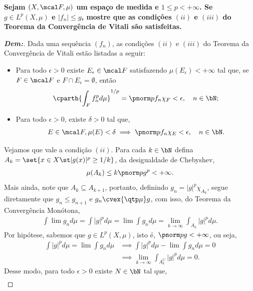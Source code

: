 \textbf{Sejam $(X, \mcal F, \mu)$ um espaço de medida e $1 \le p < + \infty$. 
Se $g \in L^p(X, \mu)$ e $|f_n| \le g$, mostre que as condições 
$(ii)$ e $(iii)$ do Teorema da Convergência de Vitali são satisfeitas.}
\begin{proof}[\textbf{Dem:}]Dada uma sequência $(f_n)$, as condições
  $(ii)$ e $(iii)$ do Teorema 
  da Convergência de Vitali estão listadas a seguir: 
  \begin{itemize}
    \item Para todo $\epsilon > 0$ existe $E_\epsilon \in \mcal F$ satisfazendo 
      $\mu(E_\epsilon)<+\infty$ tal que, se $F \in \mcal F$ e 
      $F \cap E_\epsilon = \emptyset$, então 
      \begin{align*}
        \cparth{\int_F f_n^p d\mu}^{1/p} = \pnorm p {f_n \chi_F} < \epsilon, 
        \quad n \in \bN;
      \end{align*}
    \item Para todo $\epsilon > 0$, existe $\delta >  0$ tal que, 
      \begin{align*}
        E \in \mcal F, \mu(E) < \delta \implies \pnorm p {f_n \chi_{E}} < \epsilon, 
        \quad n \in \bN.
      \end{align*}
  \end{itemize}
  Vejamos que vale a condição $(ii)$. Para cada 
  $k \in \bN$ defina $A_k = \set{x \in X \st |g(x)|^p \ge 1/k}$, 
  da desigualdade de Chebyshev,
  \begin{align*}
    \mu(A_k) \le k \pnorm p g^p < +\infty.
  \end{align*}
  Mais ainda, note que $A_{k} \subseteq A_{k+1}$, portanto, definindo 
  $g_n = |g|^p \chi_{A_k}$,
  segue diretamente que $g_n \le g_{n+1}$ e $g_n \cvex {\qtp \mu} g$, com isso, do Teorema 
  da Convergência Monótona, 
  \begin{align*}
    \int \lim g_n d\mu = \int|g|^p d\mu = \lim \int g_n d\mu 
    = \lim_{k \rightarrow \infty} \int_{A_k} |g|^p d\mu.
  \end{align*}
  Por hipótese, sabemos que $g \in L^p(X, \mu)$, isto é, $\pnorm p g < +\infty$, ou seja,
  \begin{align*}
    \int |g|^p d\mu = \lim \int g_n d\mu &\implies \int |g|^p d\mu - \lim \int g_n d\mu = 0\\
    &\implies \lim_{k \rightarrow \infty} \int_{A_k^C}|g|^p d\mu = 0. 
  \end{align*}
  Desse modo, para todo $\epsilon > 0$ existe $N \in \bN$ tal que,  
  \begin{align*}

\end{align*}
\end{proof}

